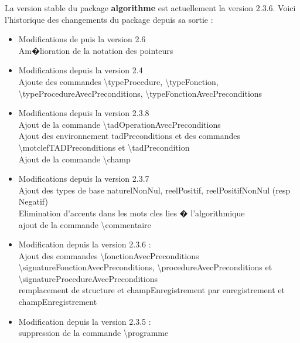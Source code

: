 \documentclass[a4paper,12pt]{report}
\begin{document}
La version stable du package \textbf{algorithme} est actuellement la version 2.3.6.
Voici l'historique des changements du package depuis sa sortie : 
\begin{itemize}

  \item Modifications de puis la version 2.6\\
    \textbullet   Am�lioration de la notation des pointeurs

  \item Modifications depuis la version 2.4\\
    \textbullet   Ajoute des commandes \textbackslash typeProcedure, \textbackslash typeFonction, \textbackslash typeProcedureAvecPreconditions, \textbackslash typeFonctionAvecPreconditions

  \item Modifications depuis la version 2.3.8\\
    \textbullet   Ajout de la commande \textbackslash tadOperationAvecPreconditions\\
    \textbullet   Ajout des environnement tadPreconditions et des commandes \textbackslash motclefTADPreconditions  et \textbackslash tadPrecondition\\
    \textbullet   Ajout de la commande \textbackslash champ


  \item Modifications depuis la version 2.3.7\\
    \textbullet   Ajout des types de base naturelNonNul, reelPositif, reelPositifNonNul (resp Negatif)\\
    \textbullet   Elimination d'accents dans les mots cles lies � l'algorithmique\\
    \textbullet   ajout de la commande \textbackslash commentaire
    
  \item Modification depuis la version 2.3.6 :\\
    \textbullet   Ajout des commandes \textbackslash fonctionAvecPreconditions \textbackslash signatureFonctionAvecPreconditions, \textbackslash procedureAvecPreconditions et \textbackslash signatureProcedureAvecPreconditions\\
    \textbullet   remplacement de structure et champEnregistrement par enregistrement et champEnregistrement\\

  \item  Modification depuis la version 2.3.5 :\\
   \textbullet   suppression de la commande \textbackslash programme
  

\end{itemize}
\end{document}

